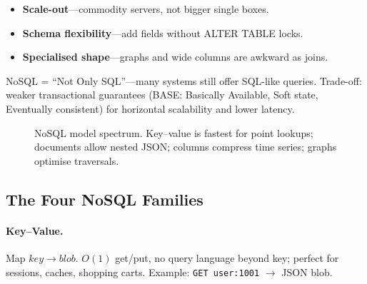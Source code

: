 \begin{itemize}
    \item \textbf{Scale-out}---commodity servers, not bigger single boxes.
    \item \textbf{Schema flexibility}---add fields without ALTER TABLE locks.
    \item \textbf{Specialised shape}---graphs and wide columns are awkward as joins.
\end{itemize}

NoSQL = ``Not Only SQL''---many systems still offer SQL-like queries. Trade-off: weaker transactional guarantees (BASE: Basically Available, Soft state, Eventually consistent) for horizontal scalability and lower latency.

\begin{figure}[h]
\centering
{}
\caption{NoSQL model spectrum. Key--value is fastest for point lookups; documents allow nested JSON; columns compress time series; graphs optimise traversals.}
\label{fig:nosql-spectrum}
\end{figure}

\subsection{The Four NoSQL Families}

\paragraph{Key--Value.} Map $\mathit{key}\to\mathit{blob}$. $O(1)$ get/put, no query language beyond key; perfect for sessions, caches, shopping carts. Example: \texttt{GET user:1001} $\to$ JSON blob.

